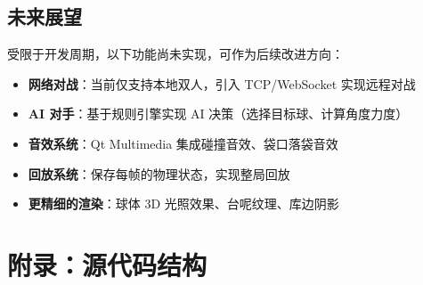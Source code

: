 \documentclass[11pt]{ctexart}
\begin{document}
\subsection{未来展望}

受限于开发周期，以下功能尚未实现，可作为后续改进方向：

\begin{itemize}
\item \textbf{网络对战}：当前仅支持本地双人，引入 TCP/WebSocket 实现远程对战
\item \textbf{AI 对手}：基于规则引擎实现 AI 决策（选择目标球、计算角度力度）
\item \textbf{音效系统}：Qt Multimedia 集成碰撞音效、袋口落袋音效
\item \textbf{回放系统}：保存每帧的物理状态，实现整局回放
\item \textbf{更精细的渲染}：球体 3D 光照效果、台呢纹理、库边阴影
\end{itemize}

\section*{附录：源代码结构}
\end{document}
